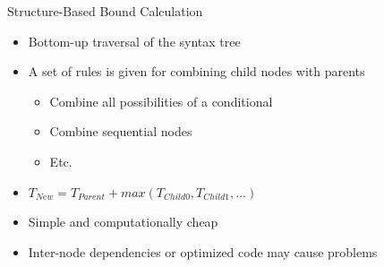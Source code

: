 \documentclass{beamer}
\begin{document}
\begin{frame}{Structure-Based Bound Calculation}
  \begin{itemize}
    \item Bottom-up traversal of the syntax tree
    \item A set of rules is given for combining child nodes with parents
      \begin{itemize}
        \item Combine all possibilities of a conditional
        \item Combine sequential nodes
        \item Etc.
      \end{itemize}
    \item $T_{New} =  T_{Parent} + max(T_{Child0}, T_{Child1},\dots)$
    \item Simple and computationally cheap
    \item Inter-node dependencies or optimized code may cause problems
  \end{itemize}
\end{frame}
\end{document}
